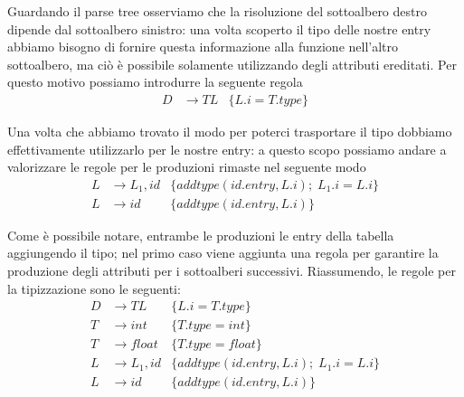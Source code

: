 \documentclass[class=book, crop=false, oneside, 12pt]{standalone}
\begin{document}
Guardando il parse tree osserviamo che la risoluzione del sottoalbero destro dipende dal sottoalbero sinistro: una volta scoperto il tipo delle nostre entry abbiamo bisogno di fornire questa informazione alla funzione nell'altro sottoalbero, ma ciò è possibile solamente utilizzando degli attributi ereditati. Per questo motivo possiamo introdurre la seguente regola
\begin{align*}
    D &\to TL &\{L.i = T.type\}
\end{align*}

Una volta che abbiamo trovato il modo per poterci trasportare il tipo dobbiamo effettivamente utilizzarlo per le nostre entry: a questo scopo possiamo andare a valorizzare le regole per le produzioni rimaste nel seguente modo
\begin{align*}
    L &\to L_1, id &\{addtype(id.entry, L.i);\; L_1.i = L.i\}\\
    L &\to id &\{addtype(id.entry, L.i)\}
\end{align*}

Come è possibile notare, entrambe le produzioni le entry della tabella aggiungendo il tipo; nel primo caso viene aggiunta una regola per garantire la produzione degli attributi per i sottoalberi successivi.  
Riassumendo, le regole per la tipizzazione sono le seguenti:
\begin{align*}
    D &\to TL &\{L.i = T.type\} \\
    T &\to int &\{T.type = int\} \\
    T &\to float &\{T.type = float\} \\
    L &\to L_1, id &\{addtype(id.entry, L.i);\; L_1.i = L.i\}\\
    L &\to id &\{addtype(id.entry, L.i)\}
\end{align*}
\end{document}
